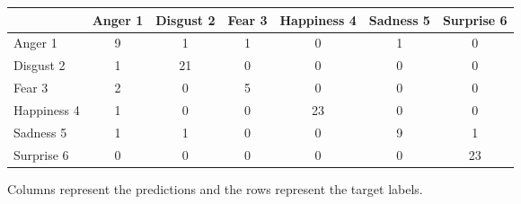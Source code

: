 \begin{figure}[h]
\begin{center}
    \begin{tabular}{ | l || c | c | c | c | c | c | }
    \hline
          & Anger 1 & Disgust 2 & Fear 3 & Happiness 4 & Sadness 5 & Surprise 6 \\ \hline \hline
        Anger 1 & 9 & 1 & 1 & 0 & 1 & 0 \\ \hline
        Disgust 2 & 1 & 21 & 0 & 0 & 0 & 0 \\ \hline
        Fear 3 & 2 & 0 & 5 & 0 & 0 & 0 \\ \hline
        Happiness 4 & 1 & 0 & 0 & 23 & 0 & 0 \\ \hline
        Sadness 5 & 1 & 1 & 0 & 0 & 9 & 1 \\ \hline
        Surprise 6 & 0 & 0 & 0 & 0 & 0 & 23 \\ \hline
    \end{tabular}
    \caption{Columns represent the predictions and the rows represent the target labels.}
    \label{fig:confusionMatrix}
\end{center}
\end{figure}
